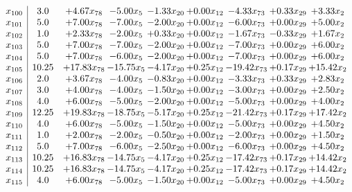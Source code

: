 \documentclass[8pt]{article}
\begin{document}
\[\begin{array}{c| c c@{\hskip 2pt} c@{\hskip 2pt} c@{\hskip 2pt} c@{\hskip 2pt} c@{\hskip 2pt} c@{\hskip 2pt} c@{\hskip 2pt} }
 x_{100}   &  3.0 & +  4.67 x_{78} & -5.00 x_{5} & -1.33 x_{20} & +  0.00 x_{12} & -4.33 x_{73} & +  0.33 x_{29} & +  3.33 x_{2}\\
 x_{101}   &  5.0 & +  7.00 x_{78} & -7.00 x_{5} & -2.00 x_{20} & +  0.00 x_{12} & -6.00 x_{73} & +  0.00 x_{29} & +  5.00 x_{2}\\
 x_{102}   &  1.0 & +  2.33 x_{78} & -2.00 x_{5} & +  0.33 x_{20} & +  0.00 x_{12} & -1.67 x_{73} & -0.33 x_{29} & +  1.67 x_{2}\\
 x_{103}   &  5.0 & +  7.00 x_{78} & -7.00 x_{5} & -2.00 x_{20} & +  0.00 x_{12} & -7.00 x_{73} & +  0.00 x_{29} & +  6.00 x_{2}\\
 x_{104}   &  5.0 & +  7.00 x_{78} & -6.00 x_{5} & -2.00 x_{20} & +  0.00 x_{12} & -7.00 x_{73} & +  0.00 x_{29} & +  6.00 x_{2}\\
 x_{105}   &  10.25 & + 17.83 x_{78} & -15.75 x_{5} & -4.17 x_{20} & +  0.25 x_{12} & -19.42 x_{73} & +  0.17 x_{29} & + 15.42 x_{2}\\
 x_{106}   &  2.0 & +  3.67 x_{78} & -4.00 x_{5} & -0.83 x_{20} & +  0.00 x_{12} & -3.33 x_{73} & +  0.33 x_{29} & +  2.83 x_{2}\\
 x_{107}   &  3.0 & +  4.00 x_{78} & -4.00 x_{5} & -1.50 x_{20} & +  0.00 x_{12} & -3.00 x_{73} & +  0.00 x_{29} & +  2.50 x_{2}\\
 x_{108}   &  4.0 & +  6.00 x_{78} & -5.00 x_{5} & -2.00 x_{20} & +  0.00 x_{12} & -5.00 x_{73} & +  0.00 x_{29} & +  4.00 x_{2}\\
 x_{109}   &  12.25 & + 19.83 x_{78} & -18.75 x_{5} & -5.17 x_{20} & +  0.25 x_{12} & -21.42 x_{73} & +  0.17 x_{29} & + 17.42 x_{2}\\
 x_{110}   &  4.0 & +  6.00 x_{78} & -5.00 x_{5} & -1.50 x_{20} & +  0.00 x_{12} & -5.00 x_{73} & +  0.00 x_{29} & +  4.50 x_{2}\\
 x_{111}   &  1.0 & +  2.00 x_{78} & -2.00 x_{5} & -0.50 x_{20} & +  0.00 x_{12} & -2.00 x_{73} & +  0.00 x_{29} & +  1.50 x_{2}\\
 x_{112}   &  5.0 & +  7.00 x_{78} & -6.00 x_{5} & -2.50 x_{20} & +  0.00 x_{12} & -6.00 x_{73} & +  0.00 x_{29} & +  4.50 x_{2}\\
 x_{113}   &  10.25 & + 16.83 x_{78} & -14.75 x_{5} & -4.17 x_{20} & +  0.25 x_{12} & -17.42 x_{73} & +  0.17 x_{29} & + 14.42 x_{2}\\
 x_{114}   &  10.25 & + 16.83 x_{78} & -14.75 x_{5} & -4.17 x_{20} & +  0.25 x_{12} & -17.42 x_{73} & +  0.17 x_{29} & + 14.42 x_{2}\\
 x_{115}   &  4.0 & +  6.00 x_{78} & -5.00 x_{5} & -1.50 x_{20} & +  0.00 x_{12} & -5.00 x_{73} & +  0.00 x_{29} & +  4.50 x_{2}\\

\end{array}\]
\end{document}
